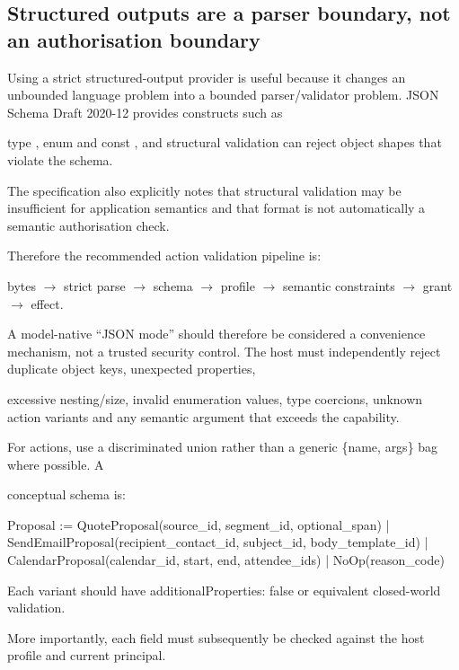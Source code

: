 \documentclass[11pt,a4paper]{article}
\begin{document}
\subsection*{Structured outputs are a parser boundary, not an authorisation boundary}
Using a strict structured-output provider is useful because it changes an unbounded language problem into a bounded parser/validator problem. JSON Schema Draft 2020-12 provides constructs such as\par
type , enum  and const , and structural validation can reject object shapes that violate the schema.\par
The specification also explicitly notes that structural validation may be insufficient for application semantics and that format  is not automatically a semantic authorisation check.\par
Therefore the recommended action validation pipeline is:\par
bytes  $\rightarrow$ strict parse  $\rightarrow$ schema  $\rightarrow$ profile  $\rightarrow$ semantic constraints  $\rightarrow$ grant  $\rightarrow$ effect.\par
A model-native “JSON mode” should therefore be considered a convenience mechanism, not a trusted security control. The host must independently reject duplicate object keys, unexpected properties,\par
excessive nesting/size, invalid enumeration values, type coercions, unknown action variants and any semantic argument that exceeds the capability.\par
For actions, use a discriminated union rather than a generic \{name, args\}  bag where possible. A\par
conceptual schema is:\par
Proposal := QuoteProposal(source\_id, segment\_id, optional\_span) | SendEmailProposal(recipient\_contact\_id, subject\_id, body\_template\_id) | CalendarProposal(calendar\_id, start, end, attendee\_ids) | NoOp(reason\_code)\par
Each variant should have additionalProperties: false  or equivalent closed-world validation.\par
More importantly, each field must subsequently be checked against the host profile and current principal.\par
\end{document}
